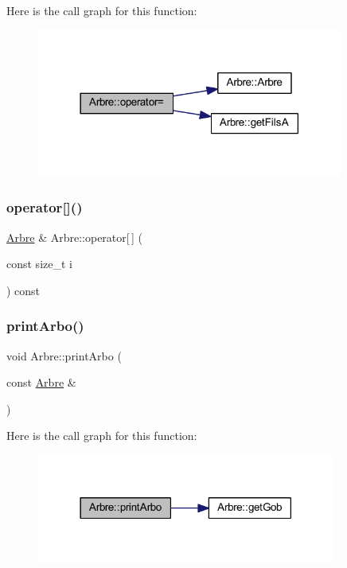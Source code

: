 Here is the call graph for this function\+:
\nopagebreak
\begin{figure}[H]
\begin{center}
\leavevmode
\includegraphics[width=285pt]{class_arbre_a9983712c900965e153ee7340f80e42c2_cgraph}
\end{center}
\end{figure}
\mbox{\label{class_arbre_a98d37af19d33de04350fe50c83f4a70d}} 
\subsubsection{\texorpdfstring{operator[]()}{operator[]()}}
{\footnotesize\ttfamily \hyperlink{class_arbre}{Arbre} \& Arbre\+::operator\mbox{[}$\,$\mbox{]} (\begin{DoxyParamCaption}\item[{const size\+\_\+t}]{i }\end{DoxyParamCaption}) const}

\mbox{\label{class_arbre_ac6329911b0037ca669e6ef2e12a178c9}} 
\subsubsection{\texorpdfstring{print\+Arbo()}{printArbo()}}
{\footnotesize\ttfamily void Arbre\+::print\+Arbo (\begin{DoxyParamCaption}\item[{const \hyperlink{class_arbre}{Arbre} \&}]{ }\end{DoxyParamCaption})}

Here is the call graph for this function\+:
\nopagebreak
\begin{figure}[H]
\begin{center}
\leavevmode
\includegraphics[width=278pt]{class_arbre_ac6329911b0037ca669e6ef2e12a178c9_cgraph}
\end{center}
\end{figure}
\mbox{\label{class_arbre_a70585b1d341c1e0c262b2b4a4f769b6d}} 
